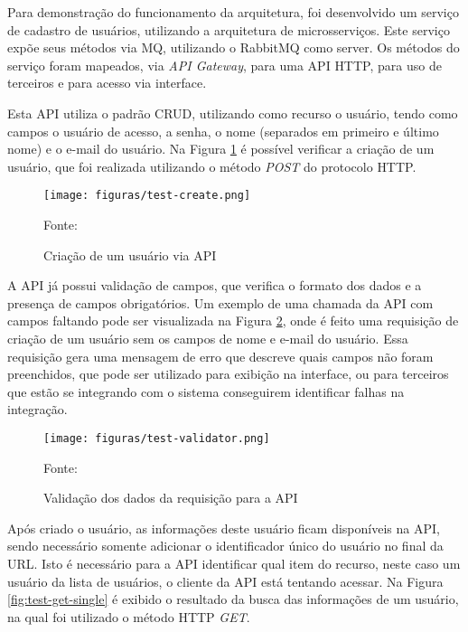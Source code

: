 Para demonstração do funcionamento da arquitetura, foi desenvolvido um
serviço de cadastro de usuários, utilizando a arquitetura de microsserviços.
Este serviço expõe seus métodos via \ac{MQ}, utilizando o RabbitMQ como server.
Os métodos do serviço foram mapeados, via \emph{API Gateway}, para uma
\ac{API} \ac{HTTP}, para uso de terceiros e para acesso via interface.

Esta \ac{API} utiliza o padrão \ac{CRUD}, utilizando como recurso o usuário,
tendo como campos o usuário de acesso, a senha, o nome (separados
em primeiro e último nome) e o e-mail do usuário. Na Figura
\ref{fig:test-create} é possível verificar a criação de um usuário, que
foi realizada utilizando o método \emph{POST} do protocolo \ac{HTTP}.

\begin{figure}[H]
	\centering
	\caption{Criação de um usuário via API}
	\texttt{[image: figuras/test-create.png]}

	\label{fig:test-create}
	\footnotesize Fonte: \fonteOAutor
\end{figure}

A \ac{API} já possui validação de campos, que verifica o formato dos dados
e a presença de campos obrigatórios. Um exemplo de uma chamada da \ac{API}
com campos faltando pode ser visualizada na Figura \ref{fig:test-validator},
onde é feito uma requisição de criação de um usuário sem os campos de nome
e e-mail do usuário. Essa requisição gera uma mensagem de erro que descreve
quais campos não foram preenchidos, que pode ser utilizado para exibição
na interface, ou para terceiros que estão se integrando com o sistema
conseguirem identificar falhas na integração.

\begin{figure}[H]
	\centering
	\caption{Validação dos dados da requisição para a API}
	\texttt{[image: figuras/test-validator.png]}

	\label{fig:test-validator}
	\footnotesize Fonte: \fonteOAutor
\end{figure}

Após criado o usuário, as informações deste usuário ficam disponíveis na
\ac{API}, sendo necessário somente adicionar o identificador único do usuário
no final da \ac{URL}. Isto é necessário para a \ac{API} identificar qual
item do recurso, neste caso um usuário da lista de usuários, o cliente da
\ac{API} está tentando acessar. Na Figura \ref{fig:test-get-single} é exibido
o resultado da busca das informações de um usuário, na qual foi utilizado o
método \ac{HTTP} \emph{GET}.

